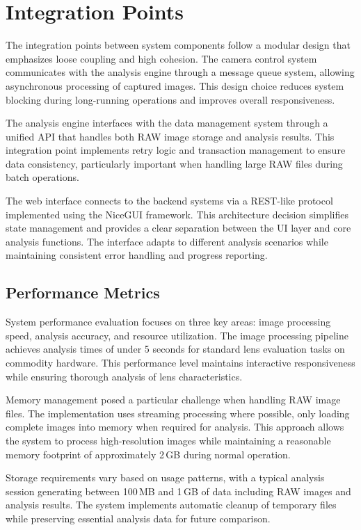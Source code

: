 \section{Integration Points} %
The integration points between system components follow a modular design that emphasizes loose coupling and high cohesion. The camera control system communicates with the analysis engine through a message queue system, allowing asynchronous processing of captured images. This design choice reduces system blocking during long-running operations and improves overall responsiveness.

The analysis engine interfaces with the data management system through a unified API that handles both RAW image storage and analysis results. This integration point implements retry logic and transaction management to ensure data consistency, particularly important when handling large RAW files during batch operations.

The web interface connects to the backend systems via a REST-like protocol implemented using the NiceGUI framework. This architecture decision simplifies state management and provides a clear separation between the UI layer and core analysis functions. The interface adapts to different analysis scenarios while maintaining consistent error handling and progress reporting.

\subsection{Performance Metrics}
System performance evaluation focuses on three key areas: image processing speed, analysis accuracy, and resource utilization. The image processing pipeline achieves analysis times of under 5 seconds for standard lens evaluation tasks on commodity hardware. This performance level maintains interactive responsiveness while ensuring thorough analysis of lens characteristics.

Memory management posed a particular challenge when handling RAW image files. The implementation uses streaming processing where possible, only loading complete images into memory when required for analysis. This approach allows the system to process high-resolution images while maintaining a reasonable memory footprint of approximately 2\,GB during normal operation.

Storage requirements vary based on usage patterns, with a typical analysis session generating between 100\,MB and 1\,GB of data including RAW images and analysis results. The system implements automatic cleanup of temporary files while preserving essential analysis data for future comparison.

